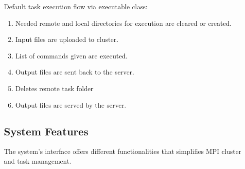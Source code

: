 \documentclass[journal]{./IEEE/IEEEtran}
\begin{document}
		 Default task execution flow via executable class:			
		\begin{enumerate}
			\item  Needed remote and local directories for execution are cleared or created.
			\item  Input files are uploaded to cluster.
			\item  List of commands given are executed.
			\item  Output files are sent back to the server.
			\item  Deletes remote task folder
			\item  Output files are served by the server.
		\end{enumerate}
		
		
		
	\subsection{System Features}The system's interface offers different functionalities that simplifies MPI cluster and task management.
		
\end{document}

